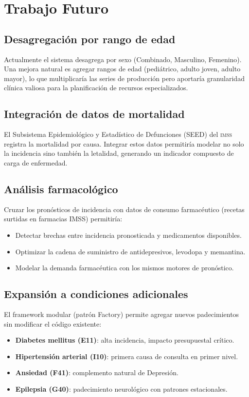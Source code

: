 \documentclass[12pt, letterpaper]{article}
\newcommand{\imss}{\textnormal{\textsc{imss}}}
\begin{document}
\section{Trabajo Futuro}\label{sec:futuro}

\subsection{Desagregación por rango de edad}

Actualmente el sistema desagrega por sexo (Combinado, Masculino, Femenino). Una mejora natural es agregar rangos de edad (pediátrico, adulto joven, adulto mayor), lo que multiplicaría las series de producción pero aportaría granularidad clínica valiosa para la planificación de recursos especializados.

\subsection{Integración de datos de mortalidad}

El Subsistema Epidemiológico y Estadístico de Defunciones (SEED) del {\imss} registra la mortalidad por causa. Integrar estos datos permitiría modelar no solo la incidencia sino también la letalidad, generando un indicador compuesto de carga de enfermedad.

\subsection{Análisis farmacológico}

Cruzar los pronósticos de incidencia con datos de consumo farmacéutico (recetas surtidas en farmacias IMSS) permitiría:
\begin{itemize}[noitemsep]
    \item Detectar brechas entre incidencia pronosticada y medicamentos disponibles.
    \item Optimizar la cadena de suministro de antidepresivos, levodopa y memantina.
    \item Modelar la demanda farmacéutica con los mismos motores de pronóstico.
\end{itemize}

\subsection{Expansión a condiciones adicionales}

El framework modular (patrón Factory) permite agregar nuevos padecimientos sin modificar el código existente:
\begin{itemize}[noitemsep]
    \item \textbf{Diabetes mellitus (E11)}: alta incidencia, impacto presupuestal crítico.
    \item \textbf{Hipertensión arterial (I10)}: primera causa de consulta en primer nivel.
    \item \textbf{Ansiedad (F41)}: complemento natural de Depresión.
    \item \textbf{Epilepsia (G40)}: padecimiento neurológico con patrones estacionales.
\end{itemize}
\end{document}

